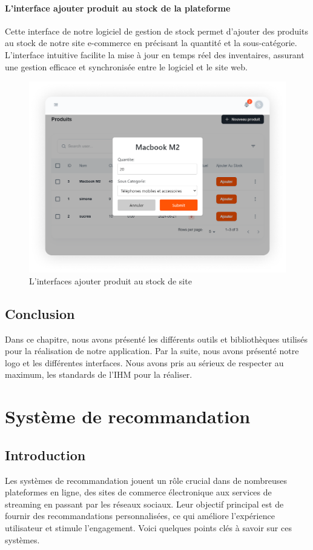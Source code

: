 \documentclass[edit,12pt,a4paper,ChapStyle,oneside,doubleinterligne]{report}
\begin{document}
\subsubsection{L'interface ajouter produit au stock de la plateforme}
Cette interface de notre logiciel de gestion de stock permet d'ajouter des produits au stock de notre site e-commerce en précisant la quantité et la sous-catégorie. L'interface intuitive facilite la mise à jour en temps réel des inventaires, assurant une gestion efficace et synchronisée entre le logiciel et le site web.
  \begin{figure} [H]
    \centering
    \includegraphics[width=1\textwidth]{images/ajouter produit au stock de site 1.png}
    \caption{L'interfaces ajouter produit au stock de site}
    \label{fig:ajouter produit au stock de site}
\end{figure}
\section{Conclusion}
Dans ce chapitre, nous avons présenté les différents outils et bibliothèques utilisés pour la réalisation de notre application.
Par la suite, nous avons présenté notre logo et les différentes interfaces. Nous avons pris au sérieux de respecter au maximum, les standards de l’IHM pour la réaliser.


\chapter{Système de recommandation}
\section{Introduction}
Les systèmes de recommandation jouent un rôle crucial dans de nombreuses plateformes en ligne, des sites de commerce électronique aux services de streaming en passant par les réseaux sociaux. Leur objectif principal est de fournir des recommandations personnalisées, ce qui améliore l'expérience utilisateur et stimule l'engagement. Voici quelques points clés à savoir sur ces systèmes.
\end{document}
